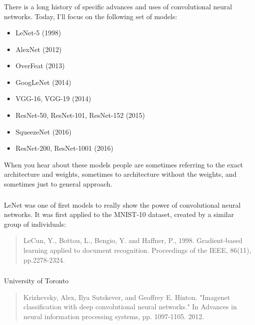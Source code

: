 \documentclass[xetex,mathserif,serif,aspectratio=169]{beamer}
\begin{document}
\begin{frame}[fragile] \frametitle{} \oldB \small


There is a long history of specific advances and uses of convolutional
neural networks. Today, I'll focus on the following set of models:
\begin{itemize}
\item LeNet-5 (1998)
\item AlexNet (2012)
\item OverFeat (2013)
\item GoogLeNet (2014)
\item VGG-16, VGG-19 (2014)
\item ResNet-50, ResNet-101, ResNet-152 (2015)
\item SqueezeNet (2016)
\item ResNet-200, ResNet-1001 (2016)
\end{itemize}
When you hear about these models people are sometimes referring to the exact
architecture and weights, sometimes to architecture without the weights, and
sometimes just to general approach.

\end{frame}

\begin{frame}[fragile] \frametitle{} \oldB \small


LeNet was one of first models to really show the power of convolutional
neural networks. It was first applied to the MNIST-10 dataset, created
by a similar group of individuals:
\begin{quote}
LeCun, Y., Bottou, L., Bengio, Y. and Haffner, P., 1998. Gradient-based
learning applied to document recognition. Proceedings of the IEEE, 86(11),
pp.2278-2324.
\end{quote}


\end{frame}

\begin{frame}[fragile] \frametitle{} \oldB \small


University of Toronto
\begin{quote}
Krizhevsky, Alex, Ilya Sutskever, and Geoffrey E. Hinton. "Imagenet classification with deep convolutional neural networks." In Advances in neural information processing systems, pp. 1097-1105. 2012.
\end{quote}

\end{frame}
\end{document}
